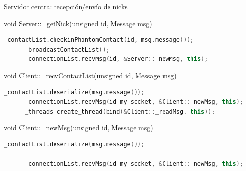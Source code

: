 \documentclass[spanish,xcolor=dvipsnames,svgnames]{beamer}
\begin{document}
\begin{frame}[fragile]{Servidor centra: recepción/envío de nicks}
  \begin{block}{void Server::\_getNick(unsigned id, Message msg)}
    \begin{lstlisting}[language=C++]
      _contactList.checkinPhantomContact(id, msg.message());
      _broadcastContactList();
      _connectionList.recvMsg(id, &Server::_newMsg, this);
    \end{lstlisting}
  \end{block}

  \pause

  \begin{block}{void Client::\_recvContactList(unsigned id, Message msg)}
    \begin{lstlisting}[language=C++]
      _contactList.deserialize(msg.message());
      _connectionList.recvMsg(id_my_socket, &Client::_newMsg, this);
      _threads.create_thread(bind(&Client::_readMsg, this));
    \end{lstlisting}
  \end{block}

  \pause

  \begin{block}{void Client::\_newMsg(unsigned id, Message msg)}
    \begin{lstlisting}[language=C++]
      _contactList.deserialize(msg.message());

      _connectionList.recvMsg(id_my_socket, &Client::_newMsg, this);
    \end{lstlisting}
  \end{block}

\end{frame}
\end{document}
